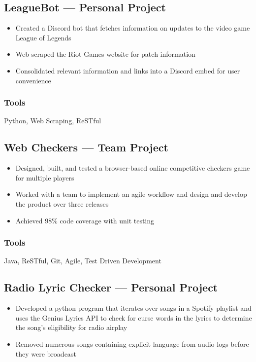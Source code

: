 \documentclass[11pt, letterpaper]{article}
\begin{document}
        \subsection{LeagueBot --- Personal Project}
        \begin{itemize}[nosep]
                \item Created a Discord bot that fetches information on updates to the video game League of 
                    Legends 
                \item Web scraped the Riot Games website for patch information 
                \item Consolidated relevant information and links into a Discord embed for user convenience
        \end{itemize}
            \subsubsection{Tools}
                Python, Web Scraping, ReSTful

        \subsection{Web Checkers --- Team Project}
            \begin{itemize}[nosep]
                \item Designed, built, and tested a browser-based online competitive checkers game for multiple 
                    players
                \item Worked with a team to implement an agile workflow and design and develop the product 
                    over three releases
                \item Achieved 98\% code coverage with unit testing
            \end{itemize}
            \subsubsection{Tools}
                Java, ReSTful, Git, Agile, Test Driven Development

        \subsection{Radio Lyric Checker --- Personal Project}
            \begin{itemize}[nosep]
                \item Developed a python program that iterates over songs in a Spotify playlist and uses the Genius 
                    Lyrics API to check for curse words in the lyrics to determine the song's eligibility for radio 
                    airplay 
                \item Removed numerous songs containing explicit language from audio logs before they were broadcast
            \end{itemize}
\end{document}
